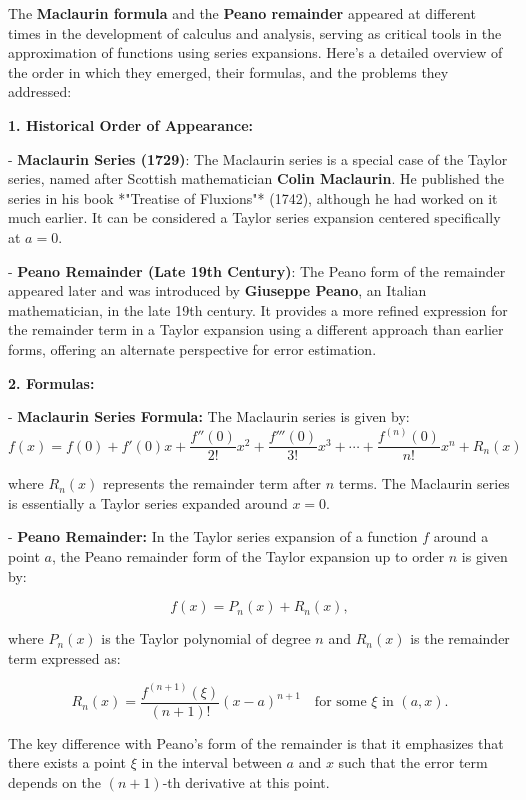 \documentclass[a4paper,12pt]{book}
\begin{document}
The \textbf{Maclaurin formula} and the \textbf{Peano remainder} appeared at different times in the development of calculus and analysis, serving as critical tools in the approximation of functions using series expansions. Here’s a detailed overview of the order in which they emerged, their formulas, and the problems they addressed:

\textbf{1. Historical Order of Appearance:}

- \textbf{Maclaurin Series (1729)}: The Maclaurin series is a special case of the Taylor series, named after Scottish mathematician \textbf{Colin Maclaurin}. He published the series in his book *"Treatise of Fluxions"* (1742), although he had worked on it much earlier. It can be considered a Taylor series expansion centered specifically at \( a = 0 \).

- \textbf{Peano Remainder (Late 19th Century)}: The Peano form of the remainder appeared later and was introduced by \textbf{Giuseppe Peano}, an Italian mathematician, in the late 19th century. It provides a more refined expression for the remainder term in a Taylor expansion using a different approach than earlier forms, offering an alternate perspective for error estimation.

\textbf{2. Formulas:}

- \textbf{Maclaurin Series Formula:}  The Maclaurin series is given by:
  \[
  f(x) = f(0) + f'(0)x + \frac{f''(0)}{2!}x^2 + \frac{f'''(0)}{3!}x^3 + \cdots + \frac{f^{(n)}(0)}{n!}x^n + R_n(x)
  \]
  
  where \( R_n(x) \) represents the remainder term after \( n \) terms. The Maclaurin series is essentially a Taylor series expanded around \( x = 0 \).

- \textbf{Peano Remainder:}  In the Taylor series expansion of a function \( f \) around a point \( a \), the Peano remainder form of the Taylor expansion up to order \( n \) is given by:

  \[
  f(x) = P_n(x) + R_n(x),
  \]
  
  where \( P_n(x) \) is the Taylor polynomial of degree \( n \) and \( R_n(x) \) is the remainder term expressed as:
  
  \[
  R_n(x) = \frac{f^{(n+1)}(\xi)}{(n+1)!}(x - a)^{n+1} \quad \text{for some } \xi \text{ in } (a, x).
  \]
  
  The key difference with Peano’s form of the remainder is that it emphasizes that there exists a point \( \xi \) in the interval between \( a \) and \( x \) such that the error term depends on the \((n+1)\)-th derivative at this point.
\end{document}
